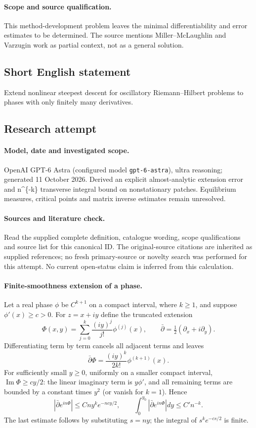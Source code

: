 \documentclass[11pt]{article}
\begin{document}
\paragraph{Scope and source qualification.}This method-development problem leaves the minimal differentiability and error estimates to be determined. The source mentions Miller--McLaughlin and Varzugin work as partial context, not as a general solution.
\subsection{Short English statement}
Extend nonlinear steepest descent for oscillatory Riemann--Hilbert problems to phases with only finitely many derivatives.
\subsection{Research attempt}
\paragraph{Model, date and investigated scope.}
OpenAI GPT-6 Astra (configured model \texttt{gpt-6-astra}), ultra reasoning; generated 11 October 2026. Derived an explicit almost-analytic extension error and n\textasciicircum{}\{-k\} transverse integral bound on nonstationary patches. Equilibrium measures, critical points and matrix inverse estimates remain unresolved.

\paragraph{Sources and literature check.}
Read the supplied complete definition, catalogue wording, scope qualifications and source list for this canonical ID. The original-source citations are inherited as supplied references; no fresh primary-source or novelty search was performed for this attempt. No current open-status claim is inferred from this calculation.

\paragraph{Finite-smoothness extension of a phase.}Let a real phase \(\phi\) be \(C^{k+1}\) on a compact interval, where \(k\ge1\), and suppose \(\phi'(x)\ge c>0\). For \(z=x+iy\) define the truncated extension
\[\Phi(x,y)=\sum_{j=0}^{k}\frac{(iy)^j}{j!}\phi^{(j)}(x),\qquad \bar\partial=\tfrac12(\partial_x+i\partial_y).
\]
Differentiating term by term cancels all adjacent terms and leaves
\[\bar\partial\Phi=\frac{(iy)^k}{2k!}\phi^{(k+1)}(x).
\]
For sufficiently small \(y\ge0\), uniformly on a smaller compact interval, \(\operatorname{Im}\Phi\ge cy/2\): the linear imaginary term is \(y\phi'\), and all remaining terms are bounded by a constant times \(y^2\) (or vanish for \(k=1\)). Hence
\[|\bar\partial e^{in\Phi}|\le C n y^k e^{-ncy/2},\qquad
\int_0^{y_0}|\bar\partial e^{in\Phi}|dy\le C' n^{-k}.
\]
The last estimate follows by substituting \(s=ny\); the integral of \(s^ke^{-cs/2}\) is finite.
\end{document}
